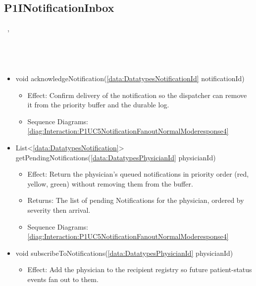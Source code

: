   \subsection{P1INotificationInbox}\label{int:InterfacesP1INotificationInbox}
    \begin{description}
      \item[Provided by:] \iconcomponent{}~, \iconcomponent{}~
      \item[Required by:] \iconcomponent{}~ 
      \item[Operations:] ~
    \begin{itemize}[noitemsep,nolistsep,leftmargin=-.25cm]
      \item \textsf{void acknowledgeNotification(\ref{data:DatatypesNotificationId} notificationId)}
        \begin{itemize}[noitemsep,nolistsep]
           \item Effect: Confirm delivery of the notification so the dispatcher can remove it from the priority buffer and the durable log. 
           \item Sequence Diagrams: \cref{diag:Interaction:P1UC5NotificationFanoutNormalModeresponse4}
        \end{itemize}
      \item \textsf{List\textless{}\ref{data:DatatypesNotification}\textgreater{} getPendingNotifications(\ref{data:DatatypesPhysicianId} physicianId)}
        \begin{itemize}[noitemsep,nolistsep]
           \item Effect: Return the physician's queued notifications in priority order (red, yellow, green) without removing them from the buffer. 
           \item Returns: The list of pending Notifications for the physician, ordered by severity then arrival.
           \item Sequence Diagrams: \cref{diag:Interaction:P1UC5NotificationFanoutNormalModeresponse4}
        \end{itemize}
      \item \textsf{void subscribeToNotifications(\ref{data:DatatypesPhysicianId} physicianId)}
        \begin{itemize}[noitemsep,nolistsep]
           \item Effect: Add the physician to the recipient registry so future patient-status events fan out to them. 

\end{itemize}
\end{itemize}
\end{description}
